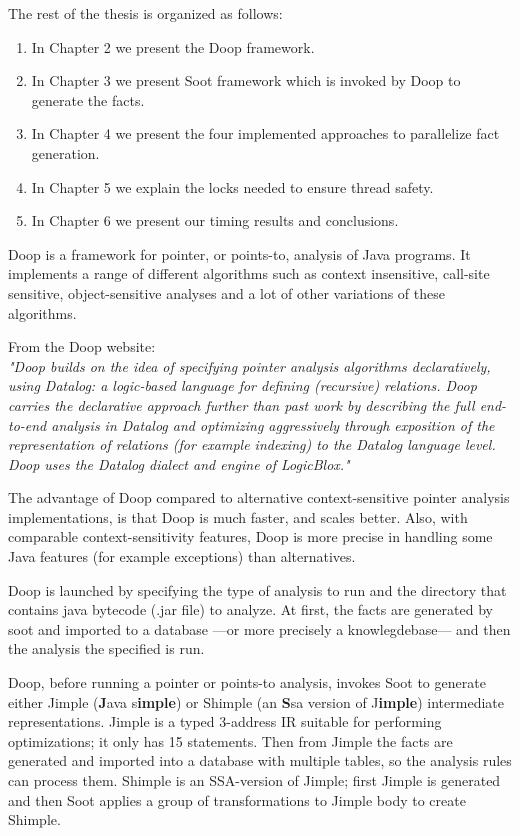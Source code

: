 \documentclass{dithesis}
\begin{document}
	The rest of the thesis is organized as follows:
	\begin{enumerate}
		\item In Chapter 2 we present the Doop framework.
		\item In Chapter 3 we present Soot framework which is invoked by Doop to generate the facts.
		\item In Chapter 4 we present the four implemented approaches to parallelize fact generation.
		\item In Chapter 5 we explain the locks needed to ensure thread safety.
		\item In Chapter 6 we present our timing results and conclusions.
	\end{enumerate}

    Doop \cite{Doop: Framework for Java Pointer Analysis} is a framework for pointer, or points-to, analysis of Java programs. It implements a range of different algorithms such as context insensitive, call-site sensitive, object-sensitive analyses and a lot of other variations of these algorithms.

	From the Doop website: \\
    \textit{"Doop builds on the idea of specifying pointer analysis algorithms declaratively, using Datalog: a logic-based language for defining (recursive) relations. Doop carries the declarative approach further than past work by describing the full end-to-end analysis in Datalog and optimizing aggressively through exposition of the representation of relations (for example indexing) to the Datalog language level. Doop uses the Datalog dialect and engine of LogicBlox."}

    The advantage of Doop compared to alternative context-sensitive pointer analysis implementations, is that Doop is much faster, and scales better. Also, with comparable context-sensitivity features, Doop is more precise in handling some Java features (for example exceptions) than alternatives.

    Doop is launched by specifying the type of analysis to run and the directory that contains java bytecode (.jar file) to analyze. At first, the facts are generated by soot and imported to a database ---or more precisely a knowlegdebase--- and then the analysis the specified is run. 

        Doop, before running a pointer or points-to analysis, invokes Soot to generate either Jimple (\textbf{J}ava s\textbf{imple}) or Shimple (an \textbf{S}sa version of J\textbf{imple}) intermediate representations. Jimple is a typed 3-address IR suitable for performing optimizations; it only has 15 statements. Then from Jimple the facts are generated and imported into a database with multiple tables, so the analysis rules can process them. Shimple is an SSA-version of Jimple; first Jimple is generated and then Soot applies a group of transformations to Jimple body to create Shimple.
\end{document}
